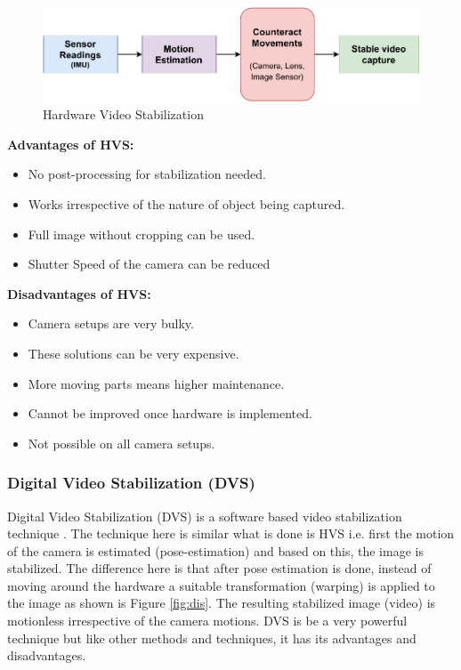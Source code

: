 \begin{figure}[H]
\centering
\includegraphics[scale=0.8]{images/fig_chapter2/2_1_his.pdf}
\caption{Hardware Video Stabilization}
\label{fig:his}
\end{figure}

\textbf{Advantages of HVS: }

\begin{itemize}
\item No post-processing for stabilization needed.
\item Works irrespective of the nature of object being captured.
\item Full image without cropping can be used.
\item Shutter Speed of the camera can be reduced
\end{itemize}

\textbf{Disadvantages of HVS:}
\begin{itemize}
\item Camera setups are very bulky.
\item These solutions can be very expensive.
\item More moving parts means higher maintenance.
\item Cannot be improved once hardware is implemented.
\item Not possible on all camera setups.
\end{itemize}

\subsubsection{Digital Video Stabilization (DVS)}
Digital Video Stabilization (DVS) is a software based video stabilization technique \citep{dis_review}. The technique here is similar what is done is HVS i.e. first the motion of the camera is estimated (pose-estimation) and based on this, the image is stabilized. The difference here is that after pose estimation is done, instead of moving around the hardware a suitable transformation (warping) is applied to the image \citep{dis_feat_track} as shown is Figure \ref{fig:dis}. The resulting stabilized image (video) is motionless irrespective of the camera motions. DVS is be a very powerful technique but like other methods and techniques, it has its advantages and disadvantages.

